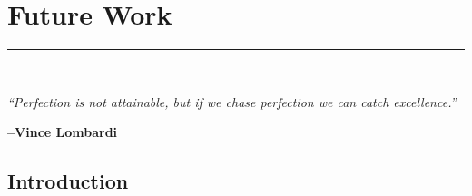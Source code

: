 \graphicspath{{content/chapters/7_future_work/figures/}}

\chapter{Future Work}%
\label{chp:future_work}
\rule{\textwidth}{1pt} \\[1ex]

\epigraph{\textit{``Perfection is not attainable, but if we chase perfection we can catch excellence.''}}{\textbf{--Vince Lombardi}}

\section{Introduction}
\label{sec:7_introduction}
